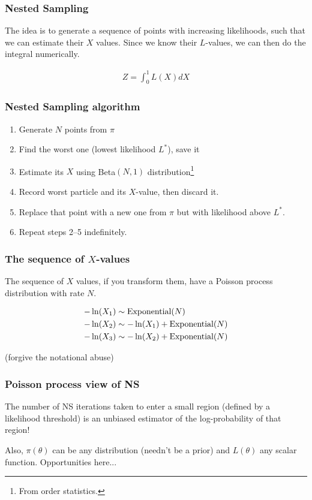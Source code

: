 \documentclass{beamer}
\begin{document}
\begin{frame}
\frametitle{Nested Sampling}
The idea is to generate a sequence of points with increasing
likelihoods, such that we can estimate their $X$ values. Since
we know their $L$-values, we can then do the integral 
numerically.

\begin{align}
Z = \int_0^1 L(X) dX
\end{align}

\end{frame}


\begin{frame}
\frametitle{Nested Sampling algorithm}

\begin{enumerate}
  \item<2-> Generate $N$ points from $\pi$
  \item<3-> Find the worst one (lowest likelihood $L^*$), save it
  \item<4-> Estimate its $X$ using Beta$(N,1)$ distribution\footnote{From order statistics.}
  \item<5-> Record worst particle and its $X$-value, then discard it.
  \item<6-> Replace that point with a new one from $\pi$ but with
        likelihood above $L^*$.
  \item<7-> Repeat steps 2--5 indefinitely.
\end{enumerate}
\end{frame}


\begin{frame}
\frametitle{The sequence of $X$-values}
The sequence of $X$ values, if you transform them, have
a Poisson process distribution with rate $N$.

\begin{align}
-\ln(X_1) &\sim \textnormal{Exponential}(N) \\
-\ln(X_2) &\sim -\ln(X_1) + \textnormal{Exponential}(N) \\
-\ln(X_3) &\sim -\ln(X_2) + \textnormal{Exponential}(N) 
\end{align}

(forgive the notational abuse)

\end{frame}

\begin{frame}
\frametitle{Poisson process view of NS}

The number of NS iterations taken
to enter a small region (defined by a likelihood threshold) 
is an unbiased estimator of the log-probability
of that region!\vspace{0.7em}

Also, $\pi(\theta)$ can be any distribution (needn't be
a prior) and $L(\theta)$ any scalar function. Opportunities here...

\end{frame}
\end{document}
